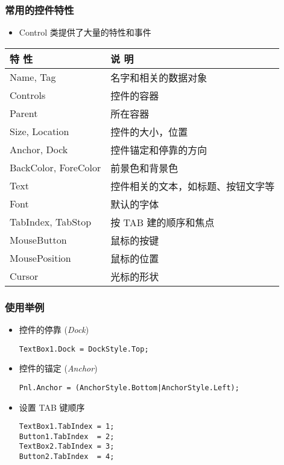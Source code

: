 \begin{frame}
\frametitle{常用的控件特性}
\begin{itemize}
\item Control 类提供了大量的特性和事件
\end{itemize}
\begin{tabular}{l|l}
\hline
特 性                & 说 明                              \\
\hline
Name, Tag            & 名字和相关的数据对象               \\
Controls             & 控件的容器                         \\
Parent               & 所在容器                           \\
\hline
Size, Location       & 控件的大小，位置                   \\
Anchor, Dock         & 控件锚定和停靠的方向               \\
BackColor, ForeColor & 前景色和背景色                     \\
\hline
Text                 & 控件相关的文本，如标题、按钮文字等 \\
Font                 & 默认的字体                         \\
\hline
TabIndex, TabStop    & 按 TAB 建的顺序和焦点             \\
MouseButton          & 鼠标的按键                         \\
MousePosition        & 鼠标的位置                         \\
Cursor               & 光标的形状                         \\
\hline
\end{tabular}
\end{frame}

\begin{frame}[fragile]
\frametitle{使用举例}
\begin{itemize}
\item 控件的停靠 (\textit{Dock})
\begin{lstlisting}
TextBox1.Dock = DockStyle.Top;
\end{lstlisting}
\item 控件的锚定 (\textit{Anchor})
\begin{lstlisting}
Pnl.Anchor = (AnchorStyle.Bottom|AnchorStyle.Left);
\end{lstlisting}
\item 设置 TAB 键顺序
\begin{lstlisting}
TextBox1.TabIndex = 1;
Button1.TabIndex  = 2;
TextBox2.TabIndex = 3;
Button2.TabIndex  = 4;
\end{lstlisting}
\end{itemize}
\end{frame}

